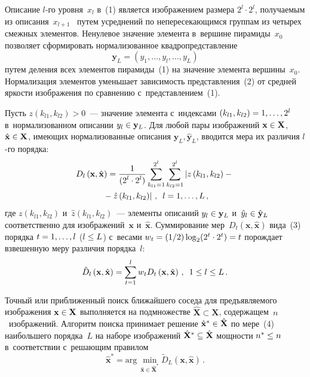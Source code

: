 \begin{multicols}{2}
  Описание $l$-го уровня~$x_l$ в~(1) является изоб\-ра\-же\-ни\-ем размера 
$2^l\cdot 2^l$, получаемым из описания~$x_{l+1}$~ путем усреднений по 
непересекающимся группам из четырех смежных элементов. Ненулевое 
значение элемента в~вершине пирамиды~$x_0$ позволяет сформировать 
нормализованное квадропредставление
  \begin{equation}
  \mathbf{y}_L=\left( y_1, \ldots , y_l,\ldots ,y_L\right)
  \label{e2-lan}
  \end{equation}
путем деления всех элементов пирамиды~(1) на значение элемента 
вершины~$x_0$. Нормализация элементов уменьшает зависимость 
представления~(2) от средней яркости изображения по сравнению 
с~представлением~(1). 
  
  Пусть $z(k_{l1}, k_{l2})>0$~--- значение элемента с~индексами $(k_{l1}, 
k_{l2})\hm=1,\ldots , 2^l$ в~нормализованном описании $y_l\hm\in 
\mathbf{y}_L$. Для любой пары изображений $\mathbf{x}\hm\in\mathbf{X}$, 
$\hat{\mathbf{x}}\hm\in\mathbf{X}$, имеющих нормализованные описания 
$\mathbf{y}_L, \hat{\mathbf{y}}_L$, вводится мера их различия $l$-го порядка:
  \begin{multline}
  D_l\left(\mathbf{x}, \hat{\mathbf{x}}\right) = \fr{1}{(2^l\cdot 2^l)} 
\sum\limits_{k_{l1}=1}^{2^l} \sum\limits^{2^l}_{k_{l2}=1} \left\vert z\left( 
k_{l1}, k_{l2}\right) -{}\right.\\
\left.{}-\hat{z}\left(k_{l1}, k_{l2}\right) %
\right\vert\,,\enskip l=1,\ldots ,L\,,
  \label{e3-lan}
  \end{multline}
где $ z\left( k_{l1}, k_{l2}\right)$ и~$ \hat{z}\left( k_{l1}, k_{l2}\right)$~--- 
элементы описаний $y_l\hm\in\mathbf{y}_L$ и~$\hat{y}_l\hm\in 
\hat{\mathbf{y}}_L$ соответственно для изображений~$\mathbf{x}$ 
и~$\hat{\mathbf{x}}$. Суммирование мер~$D_t(\mathbf{x}, \hat{\mathbf{x}})$ 
вида~(3) порядка $t\hm=1,\ldots , l$ ($l\hm\leq L$) с~весами 
$w_t=(1/2)\log_2(2^t\cdot 2^t)\hm=t$ порождает взвешенную меру различия 
порядка~$l$:
\begin{equation}
\tilde{D}_l\left( \mathbf{x},\hat{\mathbf{x}}\right)=\sum\limits^l_{t=1} w_t 
D_t\left(\mathbf{x}, \hat{\mathbf{x}}\right)\,,\enskip 1\leq l\leq L\,.
\label{e4-lan}
\end{equation}
  
  Точный или приближенный поиск ближайшего соседа для предъявляемого 
изображения $\mathbf{x}\hm\in\mathbf{X}$ выполняется на подмножестве 
$\hat{\mathbf{X}}\subset \mathbf{X}$, содержащем~$n$~изображений. Алгоритм 
поиска принимает решение $\hat{\mathbf{x}}^*\hm\in \hat{\mathbf{X}}$ по 
мере~(4) наибольшего порядка~$L$ на наборе изображений 
$\hat{\mathbf{X}}^*\hm\subseteq \hat{\mathbf{X}}$ мощности $n^*\hm\leq n$ 
в~соответствии с~решающим правилом
  \begin{equation}
  \hat{\mathbf{x}}^*=\mathrm{arg}\,\min\limits_{\hat{\mathbf{x}}\in \hat{\mathbf{X}}^*} 
\tilde{D}_L\left(\mathbf{x},\hat{\mathbf{x}}\right)\,.
  \label{e5-lan}
  \end{equation}
  

\end{multicols}
